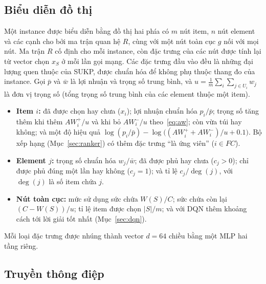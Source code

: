 \subsection{Biểu diễn đồ thị}

Một instance được biểu diễn bằng đồ thị hai phía có $m$ nút item, $n$ nút element và các cạnh cho bởi ma trận quan hệ $R$, cùng với một nút toàn cục $g$ nối với mọi nút. Ma trận $R$ cố định cho mỗi instance, còn đặc trưng của các nút được tính lại từ vector chọn $x_S$ ở mỗi lần gọi mạng. Các đặc trưng đầu vào đều là những đại lượng quen thuộc của SUKP, được chuẩn hóa để không phụ thuộc thang đo của instance. Gọi $\bar p$ và $\bar w$ là lợi nhuận và trọng số trung bình, và $u=\frac{1}{m}\sum_i\sum_{j\in U_i}w_j$ là đơn vị trọng số (tổng trọng số trung bình của các element thuộc một item).
\begin{itemize}
  \item \textbf{Item $i$:} đã được chọn hay chưa ($x_i$); lợi nhuận chuẩn hóa $p_i/\bar p$; trọng số tăng thêm khi thêm $AW^{+}_i/u$ và khi bỏ $AW^{-}_i/u$ theo~\eqref{eq:aw}; còn vừa túi hay không; và một độ hiệu quả $\log(p_i/\bar p)-\log\big((AW^{+}_i+AW^{-}_i)/u+0.1\big)$. Bộ xếp hạng (Mục~\ref{sec:ranker}) có thêm đặc trưng ``là ứng viên'' ($i\in FC$).
  \item \textbf{Element $j$:} trọng số chuẩn hóa $w_j/\bar w$; đã được phủ hay chưa ($c_j>0$); chỉ được phủ đúng một lần hay không ($c_j=1$); và tỉ lệ $c_j/\deg(j)$, với $\deg(j)$ là số item chứa $j$.
  \item \textbf{Nút toàn cục:} mức sử dụng sức chứa $W(S)/C$; sức chứa còn lại $(C-W(S))/u$; tỉ lệ item được chọn $|S|/m$; và với DQN thêm khoảng cách tới lời giải tốt nhất (Mục~\ref{sec:dqn}).
\end{itemize}
Mỗi loại đặc trưng được nhúng thành vector $d=64$ chiều bằng một MLP hai tầng riêng.

\subsection{Truyền thông điệp}

